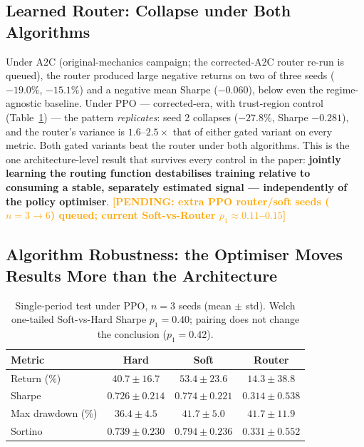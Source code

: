 \documentclass[sigconf,anonymous,review]{acmart}
\newcommand{\pending}[1]{\textcolor{orange}{\textbf{[PENDING: #1]}}}
\begin{document}
\subsection{Learned Router: Collapse under Both Algorithms}
\label{sec:results-router}

Under A2C (original-mechanics campaign; the corrected-A2C router re-run
is queued), the router produced large negative returns on two of three
seeds ($-19.0\%$, $-15.1\%$) and a negative mean Sharpe ($-0.060$),
below even the regime-agnostic baseline. Under PPO --- corrected-era,
with trust-region control (Table~\ref{tab:ppo}) --- the pattern
\emph{replicates}: seed 2 collapses ($-27.8\%$, Sharpe $-0.281$), and
the router's variance is $1.6$--$2.5\times$ that of either gated variant
on every metric. Both gated variants beat the router under both
algorithms. This is the one architecture-level result that survives
every control in the paper: \textbf{jointly learning the routing
function destabilises training relative to consuming a stable,
separately estimated signal --- independently of the policy optimiser}.
\pending{extra PPO router/soft seeds ($n{=}3\rightarrow6$) queued;
current Soft-vs-Router $p_1\approx0.11$--$0.15$}

\subsection{Algorithm Robustness: the Optimiser Moves Results More than
the Architecture}
\label{sec:results-ppo}

\begin{table}[t]
\caption{Single-period test under PPO, $n{=}3$ seeds (mean $\pm$ std).
Welch one-tailed Soft-vs-Hard Sharpe $p_1{=}0.40$; pairing does not
change the conclusion ($p_1{=}0.42$).}
\label{tab:ppo}
\begin{tabular}{lccc}
\toprule
Metric & Hard & Soft & Router \\
\midrule
Return (\%)       & $40.7 \pm 16.7$ & $53.4 \pm 23.6$ & $14.3 \pm 38.8$ \\
Sharpe            & $0.726 \pm 0.214$ & $0.774 \pm 0.221$ & $0.314 \pm 0.538$ \\
Max drawdown (\%) & $36.4 \pm 4.5$  & $41.7 \pm 5.0$  & $41.7 \pm 11.9$ \\
Sortino           & $0.739 \pm 0.230$ & $0.794 \pm 0.236$ & $0.331 \pm 0.552$ \\
\bottomrule
\end{tabular}
\end{table}
\end{document}
